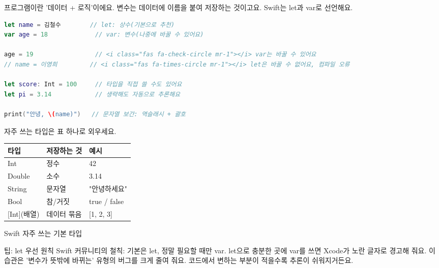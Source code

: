 


프로그램이란 '데이터 + 로직'이에요. 변수는 데이터에 이름을 붙여 저장하는 것이고요. Swift는 let과 var로 선언해요.

\begin{lstlisting}[language=Swift]
let name = 김철수        // let: 상수(기본으로 추천)
var age = 18             // var: 변수(나중에 바꿀 수 있어요)

age = 19                 // <i class="fas fa-check-circle mr-1"></i> var는 바꿀 수 있어요
// name = 이영희         // <i class="fas fa-times-circle mr-1"></i> let은 바꿀 수 없어요, 컴파일 오류

let score: Int = 100     // 타입을 직접 쓸 수도 있어요
let pi = 3.14            // 생략해도 자동으로 추론해요

print("안녕, \(name)")   // 문자열 보간: 역슬래시 + 괄호
\end{lstlisting}

자주 쓰는 타입은 표 하나로 외우세요.

\begin{center}
\begin{tabularx}{\linewidth}{|X|X|X|}
\hline
\textbf{타입} & \textbf{저장하는 것} & \textbf{예시} \tabularnewline
\hline
Int & 정수 & 42 \tabularnewline
Double & 소수 & 3.14 \tabularnewline
String & 문자열 & "안녕하세요" \tabularnewline
Bool & 참/거짓 & true / false \tabularnewline
{}[Int](배열) & 데이터 묶음 & {}[1, 2, 3] \tabularnewline
\hline
\end{tabularx}
\end{center}

\begin{center}\small\color{gray}Swift 자주 쓰는 기본 타입\end{center}

\begin{tcbinfo}{팁: let 우선 원칙}
Swift 커뮤니티의 철칙: 기본은 let, 정말 필요할 때만 var. let으로 충분한 곳에 var를 쓰면 Xcode가 노란 글자로 경고해 줘요. 이 습관은 '변수가 뜻밖에 바뀌는' 유형의 버그를 크게 줄여 줘요. 코드에서 변하는 부분이 적을수록 추론이 쉬워지거든요.

\end{tcbinfo}

